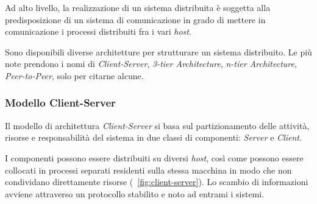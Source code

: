 Ad alto livello, la realizzazione di un sistema distribuita è soggetta alla predisposizione di un sistema di comunicazione in grado di mettere in comunicazione i processi distribuiti fra i vari \emph{host}.

Sono disponibili diverse architetture per strutturare un sistema distribuito. Le più note prendono i nomi di \emph{Client-Server}, \emph{3-tier Architecture}, \emph{n-tier Architecture}, \emph{Peer-to-Peer}, solo per citarne alcune.

\subsubsection{Modello Client-Server}
Il modello di architettura \emph{Client-Server} si basa sul partizionamento delle attività, risorse e responsabilità del sistema in due classi di componenti: \emph{Server} e \emph{Client}.

I componenti possono essere distribuiti su diversi \emph{host}, così come possono essere collocati in processi separati residenti sulla stessa macchina in modo che non condividano direttamente risorse (\figurename~\ref{fig:client-server}). Lo scambio di informazioni avviene attraverso un protocollo stabilito e noto ad entrami i sistemi.

